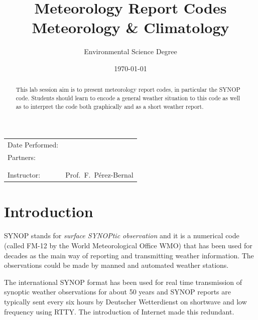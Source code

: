 \documentclass{article}
\title{\textbf{Meteorology Report Codes} \\ Meteorology
  \& Climatology} %
\author{Environmental Science Degree} %
\date{\today} %
\begin{document}
\maketitle %

\begin{center}
\begin{tabular}{l r}
Date Performed: & \underline{\hspace{3cm}}  \\ %
Partners: & \underline{\hspace{6cm}} \\ %
& \underline{\hspace{6cm}} \\
& \underline{\hspace{6cm}} \\
Instructor: & Prof.~F.~Pérez-Bernal %
\end{tabular}
\end{center}

\begin{abstract}
This lab session aim is to present meteorology report codes, in
particular the SYNOP code. Students should
learn to encode a general weather situation to this code as well as to
interpret the code both graphically and as a short weather report.
\end{abstract}

\section{Introduction}

SYNOP stands for \textit{surface SYNOPtic observation} and it is a numerical
code (called FM-12 by the World Meteorological Office WMO\cite{FM-12}) that has been used for decades as the main way of reporting and transmitting
weather information. The observations could be made by manned and automated weather stations. 

The international SYNOP format has been used for real time transmission of synoptic weather observations for about 50 years and SYNOP reports are typically sent every six hours by Deutscher
Wetterdienst on shortwave and low frequency using RTTY. The
introduction of Internet made this redundant.
\end{document}
